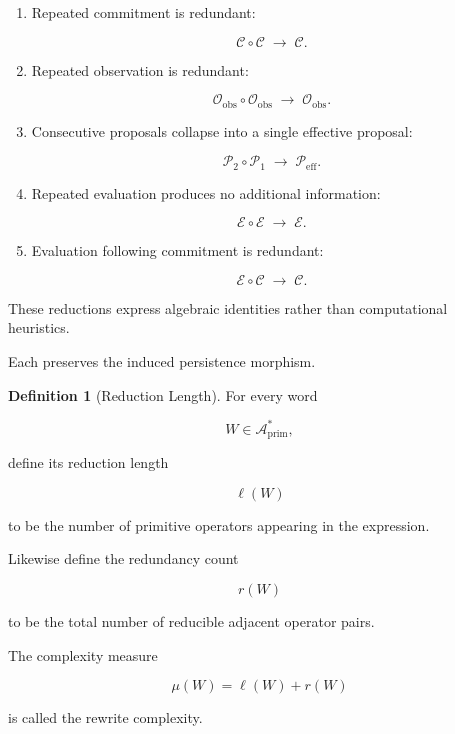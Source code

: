 \documentclass[11pt]{book}
\numberwithin{equation}{chapter}
\theoremstyle{definition}
\newtheorem{definition}{Definition}[chapter]
\theoremstyle{plain}
\begin{document}
\begin{enumerate}

\item
Repeated commitment is redundant:

\[
\mathcal C
\circ
\mathcal C
\;\longrightarrow\;
\mathcal C.
\]

\item
Repeated observation is redundant:

\[
\mathcal O_{\mathrm{obs}}
\circ
\mathcal O_{\mathrm{obs}}
\;\longrightarrow\;
\mathcal O_{\mathrm{obs}}.
\]

\item
Consecutive proposals collapse into a single effective proposal:

\[
\mathcal P_2
\circ
\mathcal P_1
\;\longrightarrow\;
\mathcal P_{\mathrm{eff}}.
\]

\item
Repeated evaluation produces no additional information:

\[
\mathcal E
\circ
\mathcal E
\;\longrightarrow\;
\mathcal E.
\]

\item
Evaluation following commitment is redundant:

\[
\mathcal E
\circ
\mathcal C
\;\longrightarrow\;
\mathcal C.
\]

\end{enumerate}

These reductions express algebraic identities rather than computational
heuristics.

Each preserves the induced persistence morphism.

\begin{definition}[Reduction Length]

For every word

\[
W
\in
\mathcal A_{\mathrm{prim}}^*,
\]

define its reduction length

\[
\ell(W)
\]

to be the number of primitive operators appearing in the expression.

Likewise define the redundancy count

\[
r(W)
\]

to be the total number of reducible adjacent operator pairs.

The complexity measure

\[
\mu(W)
=
\ell(W)+r(W)
\]

is called the rewrite complexity.

\end{definition}
\end{document}
